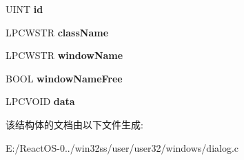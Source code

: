 \begin{DoxyCompactItemize}
U\+I\+NT {\bfseries id}
\item 
\mbox{\label{struct_d_l_g___c_o_n_t_r_o_l___i_n_f_o_a60139a8f30716b83ec722b7cd680f8c0}} 
L\+P\+C\+W\+S\+TR {\bfseries class\+Name}
\item 
\mbox{\label{struct_d_l_g___c_o_n_t_r_o_l___i_n_f_o_a82801d67f6ab43c42acb8265bd3ea643}} 
L\+P\+C\+W\+S\+TR {\bfseries window\+Name}
\item 
\mbox{\label{struct_d_l_g___c_o_n_t_r_o_l___i_n_f_o_a6b3ec69f979f392ba8aa681ae64c4ab5}} 
B\+O\+OL {\bfseries window\+Name\+Free}
\item 
\mbox{\label{struct_d_l_g___c_o_n_t_r_o_l___i_n_f_o_ab5b9f4e3b040288de7521cd0c648e20c}} 
L\+P\+C\+V\+O\+ID {\bfseries data}
\end{DoxyCompactItemize}


该结构体的文档由以下文件生成\+:\begin{DoxyCompactItemize}
\item 
E\+:/\+React\+O\+S-\/0../win32ss/user/user32/windows/dialog.\+c\end{DoxyCompactItemize}
